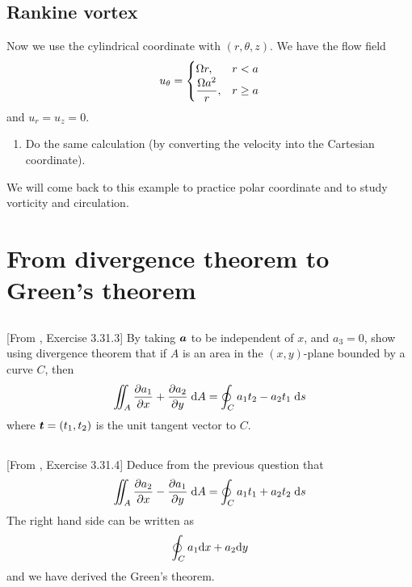\documentclass[11pt,letterpaper]{report}
\begin{document}
\subsection{Rankine vortex}
Now we use the cylindrical coordinate with $(r,\theta,z)$. We have the flow field
\begin{align}
    u_\theta = \begin{cases}
        \Omega r, & r<a\\
        \displaystyle{\frac{\Omega a^2}{r}}, & r\geq a
    \end{cases}
\end{align}
and $u_r = u_z = 0$. 
\begin{enumerate}
    \item Do the same calculation (by converting the velocity into the Cartesian coordinate).
\end{enumerate}
We will come back to this example to practice polar coordinate and to study vorticity and circulation.  

\section{From divergence theorem to Green's theorem}
\subsection{}
[From \cite{Aris_62}, Exercise 3.31.3] By taking $\boldsymbol{a}$ to be independent of $x$, and $a_3 = 0$, show using divergence theorem that if $A$ is an area in the $(x,y)$-plane bounded by a curve $C$, then
\begin{align}
    \iint_A \frac{\partial a_1}{\partial x}+\frac{\partial a_2}{\partial y}\;\mathrm{d} A = \oint_C a_1t_2-a_2t_1\;\mathrm{d} s
\end{align}
where $\boldsymbol{t}=(t_1,t_2)$ is the unit tangent vector to $C$. 

\subsection{}
[From \cite{Aris_62}, Exercise 3.31.4] Deduce from the previous question that
\begin{align}
    \iint_A \frac{\partial a_2}{\partial x}-\frac{\partial a_1}{\partial y}\;\mathrm{d} A = \oint_C a_1t_1+a_2t_2\;\mathrm{d} s
\end{align}
The right hand side can be written as
\begin{align}
    \oint_C a_1\mathrm{d} x+a_2\mathrm{d} y
\end{align}
and we have derived the Green's theorem.
\end{document}

